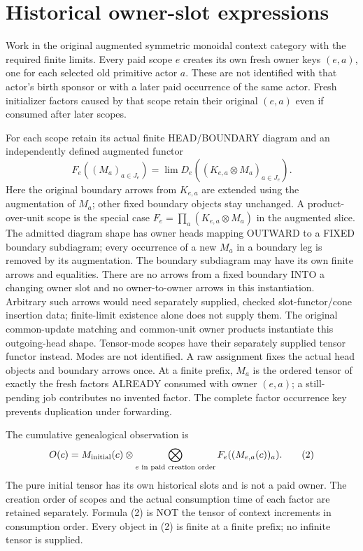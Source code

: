 \documentclass[11pt]{article}\usepackage{amsmath,amssymb,amsthm}
\begin{document}
\section{Historical owner-slot expressions}
Work in the original augmented symmetric monoidal context category with the required finite limits. Every paid scope $e$ creates its own fresh owner keys $(e,a)$, one for each selected old primitive actor $a$. These are not identified with that actor's birth sponsor or with a later paid occurrence of the same actor. Fresh initializer factors caused by that scope retain their original $(e,a)$ even if consumed after later scopes.

For each scope retain its actual finite HEAD/BOUNDARY diagram and an independently defined augmented functor
\[
 F_e((M_a)_{a\in J_e})
   =\lim D_e((K_{e,a}\otimes M_a)_{a\in J_e}).\tag{1}
\]
Here the original boundary arrows from $K_{e,a}$ are extended using the augmentation of $M_a$; other fixed boundary objects stay unchanged. A product-over-unit scope is the special case $F_e=\prod_a(K_{e,a}\otimes M_a)$ in the augmented slice. The admitted diagram shape has owner heads mapping OUTWARD to a FIXED boundary subdiagram; every occurrence of a new $M_a$ in a boundary leg is removed by its augmentation. The boundary subdiagram may have its own finite arrows and equalities. There are no arrows from a fixed boundary INTO a changing owner slot and no owner-to-owner arrows in this instantiation. Arbitrary such arrows would need separately supplied, checked slot-functor/cone insertion data; finite-limit existence alone does not supply them. The original common-update matching and common-unit owner products instantiate this outgoing-head shape. Tensor-mode scopes have their separately supplied tensor functor instead. Modes are not identified. A raw assignment fixes the actual head objects and boundary arrows once. At a finite prefix, $M_a$ is the ordered tensor of exactly the fresh factors ALREADY consumed with owner $(e,a)$; a still-pending job contributes no invented factor. The complete factor occurrence key prevents duplication under forwarding.

The cumulative genealogical observation is
\[
 O(c)=M_{\rm initial}(c)\otimes\bigotimes_{e\text{ in paid creation order}}
       F_e((M_{e,a}(c))_a).\tag{2}
\]
The pure initial tensor has its own historical slots and is not a paid owner. The creation order of scopes and the actual consumption time of each factor are retained separately. Formula (2) is NOT the tensor of context increments in consumption order. Every object in (2) is finite at a finite prefix; no infinite tensor is supplied.
\end{document}
